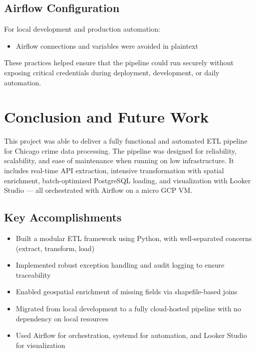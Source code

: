 \documentclass[12pt]{article}
\begin{document}
\subsection*{Airflow Configuration}
For local development and production automation:
\begin{itemize}
    \item Airflow connections and variables were avoided in plaintext
\end{itemize}
   
These practices helped ensure that the pipeline could run securely without exposing critical credentials during deployment, development, or daily automation.

\section{Conclusion and Future Work}

This project was able to deliver a fully functional and automated ETL pipeline for Chicago crime data processing. The pipeline was designed for reliability, scalability, and ease of maintenance when running on low infrastructure. It includes real-time API extraction, intensive transformation with spatial enrichment, batch-optimized PostgreSQL loading, and visualization with Looker Studio — all orchestrated with Airflow on a micro GCP VM.

\subsection*{Key Accomplishments}
\begin{itemize}
    \item Built a modular ETL framework using Python, with well-separated concerns (extract, transform, load)
    \item Implemented robust exception handling and audit logging to ensure traceability
    \item Enabled geospatial enrichment of missing fields via shapefile-based joins
    \item Migrated from local development to a fully cloud-hosted pipeline with no dependency on local resources
    \item Used Airflow for orchestration, systemd for automation, and Looker Studio for visualization
\end{itemize}
\end{document}
